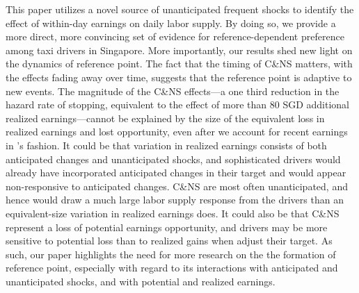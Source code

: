 \documentclass[reviewmode]{restud}
\begin{document}
This paper utilizes a novel source of unanticipated frequent shocks to identify the effect of within-day earnings on daily labor supply. By doing so, we provide a more direct, more convincing set of evidence for reference-dependent preference among taxi drivers in Singapore. More importantly, our results shed new light on the dynamics of reference point. The fact that the timing of C\&NS matters, with the effects fading away over time, suggests that the reference point is adaptive to new events. The magnitude of the C\&NS effects---a one third reduction in the hazard rate of stopping, equivalent to the effect of more than 80 SGD additional realized earnings---cannot be explained by the size of the equivalent loss in realized earnings and lost opportunity, even after we account for recent earnings in \citet{thakral2018daily}'s fashion. It could be that variation in realized earnings consists of both anticipated changes and unanticipated shocks, and sophisticated drivers would already have incorporated anticipated changes in their target and would appear non-responsive to anticipated changes. C\&NS are most often unanticipated, and hence would draw a much large labor supply response from the drivers than an equivalent-size variation in realized earnings does. It could also be that C\&NS represent a loss of potential earnings opportunity, and drivers may be more sensitive to potential loss than to realized gains when adjust their target. As such, our paper highlights the need for more research on the the formation of reference point, especially with regard to its interactions with anticipated and unanticipated shocks, and with potential and realized earnings.
\end{document}
